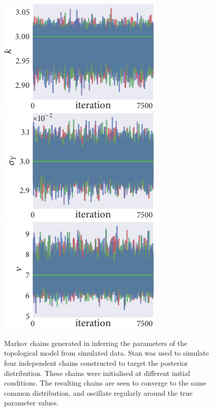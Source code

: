 \begin{figure}[tbp]
  \includegraphics{top/top_trace_k.pdf}%
  \includegraphics{top/top_trace_sigma_Y.pdf}%
  \includegraphics{top/top_trace_nu.pdf}
  \caption{Markov chains generated in inferring the parameters of the
    topological model from simulated data. Stan was used to simulate four
    independent chains constructed to target the posterior distribution.
    These chains were initialised at different initial conditions. The
    resulting chains are seen to converge to the same common distribution, and
    oscillate regularly around the true parameter values.}
  \label{fig:top_trace}
\end{figure}
